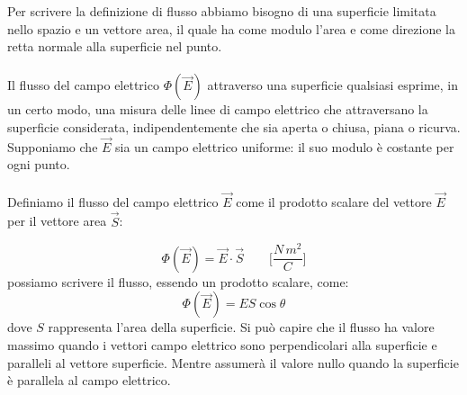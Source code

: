 Per scrivere la definizione di flusso abbiamo bisogno di una superficie limitata nello spazio e un vettore area, il quale ha come modulo l'area e come direzione la retta normale alla superficie nel punto.

\paragraph{}

Il flusso del campo elettrico $\Phi(\vec{E})$ attraverso una superficie qualsiasi esprime, in un certo modo, una misura delle linee di campo elettrico che attraversano la superficie considerata, indipendentemente che sia aperta o chiusa, piana o ricurva.
Supponiamo che $\vec{E}$ sia un campo elettrico uniforme: il suo modulo è costante per ogni punto.

\paragraph{}
Definiamo il flusso del campo elettrico $\vec{E}$ come il prodotto scalare del vettore $\vec{E}$ per il vettore area $\vec{S}$:

\begin{equation}
    \Phi(\vec{E}) = \vec{E}\cdot\vec{S}\qquad\biggl[\frac{N\,m^2}{C}\biggl]
\end{equation}
possiamo scrivere il flusso, essendo un prodotto scalare,  come:
\begin{equation}
    \Phi(\vec{E}) = ES\cos{\theta}
\end{equation}
dove $S$ rappresenta l'area della superficie.
Si può capire che il flusso ha valore massimo quando i vettori campo elettrico sono perpendicolari alla superficie e paralleli al vettore superficie. Mentre assumerà il valore nullo quando la superficie è parallela al campo elettrico.


